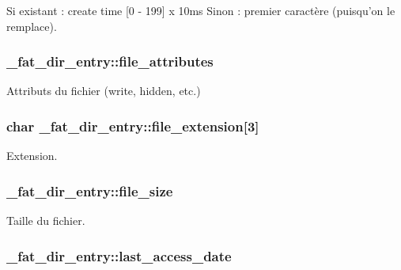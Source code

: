 \-Si existant \-: create time \mbox{[}0 -\/ 199\mbox{]} x 10ms \-Sinon \-: premier caractère (puisqu'on le remplace). \hypertarget{struct__fat__dir__entry_a4672718a4c89a279dd1c2b083ea73789}{
\subsubsection[{file\-\_\-attributes}]{ {\bf \-\_\-fat\-\_\-dir\-\_\-entry\-::file\-\_\-attributes}}}\label{struct__fat__dir__entry_a4672718a4c89a279dd1c2b083ea73789}
\-Attributs du fichier (write, hidden, etc.) \hypertarget{struct__fat__dir__entry_addf0d1b2feefb5d50d90ea66b06703b9}{
\subsubsection[{file\-\_\-extension}]{\setlength{\rightskip}{0pt plus 5cm}char {\bf \-\_\-fat\-\_\-dir\-\_\-entry\-::file\-\_\-extension}\mbox{[}3\mbox{]}}}\label{struct__fat__dir__entry_addf0d1b2feefb5d50d90ea66b06703b9}
\-Extension. \hypertarget{struct__fat__dir__entry_a557cd14b001d64851ad5e7cadb742411}{
\subsubsection[{file\-\_\-size}]{ {\bf \-\_\-fat\-\_\-dir\-\_\-entry\-::file\-\_\-size}}}\label{struct__fat__dir__entry_a557cd14b001d64851ad5e7cadb742411}
\-Taille du fichier. \hypertarget{struct__fat__dir__entry_aa53da680ae2a6594c0f956c80a1b8ca4}{
\subsubsection[{last\-\_\-access\-\_\-date}]{ {\bf \-\_\-fat\-\_\-dir\-\_\-entry\-::last\-\_\-access\-\_\-date}}}\label{struct__fat__dir__entry_aa53da680ae2a6594c0f956c80a1b8ca4}
